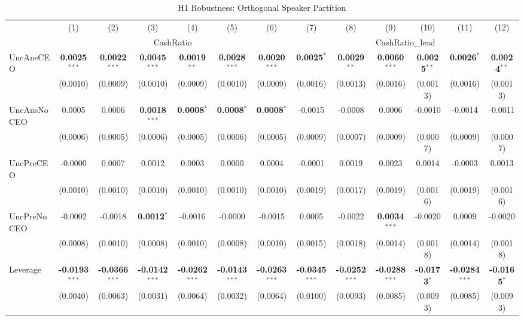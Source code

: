 \documentclass[11pt,a4paper]{article}
\begin{document}
\begin{table}[htbp]
\centering
\caption{H1 Robustness: Orthogonal Speaker Partition}
\label{tab:h1_robust}
\scriptsize
\begin{tabular}{lcccccccccccc}
\toprule
 & (1) & (2) & (3) & (4) & (5) & (6) & (7) & (8) & (9) & (10) & (11) & (12) \\
 & \multicolumn{6}{c}{CashRatio} & \multicolumn{6}{c}{CashRatio\_lead} \\
\cmidrule(lr){2-7} \cmidrule(lr){8-13}
\midrule
UncAnsCEO & \textbf{0.0025}$^{***}$ & \textbf{0.0022}$^{***}$ & \textbf{0.0045}$^{***}$ & \textbf{0.0019}$^{**}$ & \textbf{0.0028}$^{***}$ & \textbf{0.0020}$^{***}$ & \textbf{0.0025}$^{*}$ & \textbf{0.0029}$^{**}$ & \textbf{0.0060}$^{***}$ & \textbf{0.0025}$^{**}$ & \textbf{0.0026}$^{*}$ & \textbf{0.0024}$^{**}$ \\
 & (0.0010) & (0.0009) & (0.0010) & (0.0009) & (0.0010) & (0.0009) & (0.0016) & (0.0013) & (0.0016) & (0.0013) & (0.0016) & (0.0013) \\
UncAnsNoCEO & 0.0005 & 0.0006 & \textbf{0.0018}$^{***}$ & \textbf{0.0008}$^{*}$ & \textbf{0.0008}$^{*}$ & \textbf{0.0008}$^{*}$ & -0.0015 & -0.0008 & 0.0006 & -0.0010 & -0.0014 & -0.0011 \\
 & (0.0006) & (0.0005) & (0.0006) & (0.0005) & (0.0006) & (0.0005) & (0.0009) & (0.0007) & (0.0009) & (0.0007) & (0.0009) & (0.0007) \\
UncPreCEO & -0.0000 & 0.0007 & 0.0012 & 0.0003 & 0.0000 & 0.0004 & -0.0001 & 0.0019 & 0.0023 & 0.0014 & -0.0003 & 0.0013 \\
 & (0.0010) & (0.0010) & (0.0010) & (0.0010) & (0.0010) & (0.0010) & (0.0019) & (0.0017) & (0.0019) & (0.0016) & (0.0019) & (0.0016) \\
UncPreNoCEO & -0.0002 & -0.0018 & \textbf{0.0012}$^{*}$ & -0.0016 & -0.0000 & -0.0015 & 0.0005 & -0.0022 & \textbf{0.0034}$^{***}$ & -0.0020 & 0.0009 & -0.0020 \\
 & (0.0008) & (0.0010) & (0.0008) & (0.0010) & (0.0008) & (0.0010) & (0.0015) & (0.0018) & (0.0014) & (0.0018) & (0.0014) & (0.0018) \\
\midrule
Leverage & \textbf{-0.0193}$^{***}$ & \textbf{-0.0366}$^{***}$ & \textbf{-0.0142}$^{***}$ & \textbf{-0.0262}$^{***}$ & \textbf{-0.0143}$^{***}$ & \textbf{-0.0263}$^{***}$ & \textbf{-0.0345}$^{***}$ & \textbf{-0.0252}$^{***}$ & \textbf{-0.0288}$^{***}$ & \textbf{-0.0173}$^{*}$ & \textbf{-0.0284}$^{***}$ & \textbf{-0.0165}$^{*}$ \\
 & (0.0040) & (0.0063) & (0.0031) & (0.0064) & (0.0032) & (0.0064) & (0.0100) & (0.0093) & (0.0085) & (0.0093) & (0.0085) & (0.0093) \\

\end{tabular}
\end{table}
\end{document}
